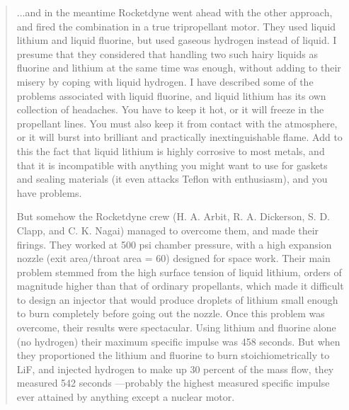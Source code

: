 \documentclass[twocolumn]{memoir} %
\begin{document}
\begin{quote}
    ...and in the meantime Rocketdyne went ahead with the other approach, and fired the
    combination in a true tripropellant motor. They used liquid lithium
    and liquid fluorine, but used gaseous hydrogen instead of liquid. I
    presume that they considered that handling two such hairy liquids as
    fluorine and lithium at the same time was enough, without adding to
    their misery by coping with liquid hydrogen. I have described some
    of the problems associated with liquid fluorine, and liquid lithium has
    its own collection of headaches. You have to keep it hot, or it will
    freeze in the propellant lines. You must also keep it from contact with
    the atmosphere, or it will burst into brilliant and practically inextinguishable 
    flame. Add to this the fact that liquid lithium is highly
    corrosive to most metals, and that it is incompatible with anything you
    might want to use for gaskets and sealing materials (it even attacks
    Teflon with enthusiasm), and you have problems.
    
    But somehow the Rocketdyne crew (H. A. Arbit, R. A. Dickerson,
    S. D. Clapp, and C. K. Nagai) managed to overcome them, and made
    their firings. They worked at 500 psi chamber pressure, with a high
    expansion nozzle (exit area/throat area = 60) designed for space
    work. Their main problem stemmed from the high surface tension
    of liquid lithium, orders of magnitude higher than that of ordinary
    propellants, which made it difficult to design an injector that would
    produce droplets of lithium small enough to burn completely before
    going out the nozzle. Once this problem was overcome, their results
    were spectacular. Using lithium and fluorine alone (no hydrogen)
    their maximum specific impulse was 458 seconds. But when they
    proportioned the lithium and fluorine to burn stoichiometrically to
    LiF, and injected hydrogen to make up 30 percent of the mass flow,
    they measured 542 seconds —probably the highest measured specific
    impulse ever attained by anything except a nuclear motor.
\end{quote}



\end{document}
